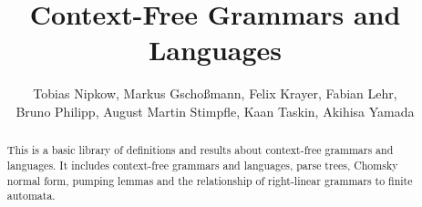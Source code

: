 \documentclass[11pt,a4paper]{article}
\begin{document}
\title{Context-Free Grammars and Languages}
\author{Tobias Nipkow, Markus Gscho{\ss}mann, Felix Krayer, Fabian Lehr, \\
 Bruno Philipp, August Martin Stimpfle, Kaan Taskin, Akihisa Yamada}
\maketitle

\begin{abstract}
This is a basic library of definitions and results about context-free grammars and languages.
It includes context-free grammars and languages, parse trees, Chomsky normal form,
pumping lemmas and the relationship of right-linear grammars to finite automata.
\end{abstract}

\tableofcontents

\newpage






\end{document}
